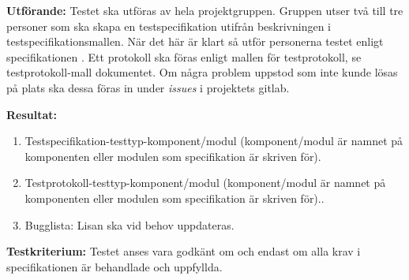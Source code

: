 \documentclass[a4paper,10pt]{article}
\begin{document}
\textbf{Utförande:} Testet ska utföras av hela projektgruppen. Gruppen utser två till tre personer som ska skapa en testspecifikation utifrån beskrivningen i testspecifikationsmallen. När det här är klart så utför personerna testet enligt specifikationen \cite{kravspec}. Ett protokoll ska föras enligt mallen för testprotokoll, se testprotokoll-mall dokumentet. Om några problem uppstod som inte kunde lösas på plats ska dessa föras in under \emph{issues} i projektets gitlab.

\textbf{Resultat:}
    \begin{enumerate}
        \item \label{itm:Testspecifikation-a} Testspecifikation-testtyp-komponent/modul (komponent/modul är namnet på komponenten eller modulen som specifikation är skriven för).
        \item \label{itm:Testprotokoll-a} Testprotokoll-testtyp-komponent/modul (komponent/modul är namnet på komponenten eller modulen som specifikation är skriven för)..
        \item Bugglista: Lisan ska vid behov uppdateras.
    \end{enumerate}

\textbf{Testkriterium:} Testet anses vara godkänt om och endast om alla krav i specifikationen är behandlade och uppfyllda.
\clearpage
\printbibliography
\end{document}

